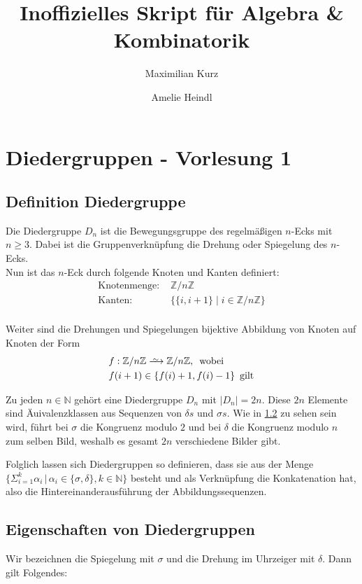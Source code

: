 \documentclass[12pt, german]{article}
\title{Inoffizielles Skript für Algebra \& Kombinatorik}
\author{Maximilian Kurz \and Amelie Heindl}
\newcommand\iso{\xrightarrow{
		\,\smash{\raisebox{-0.65ex}{\ensuremath{\scriptstyle\sim}}}\,}}
\newcommand{\N}{\mathbb{N}}
\begin{document}
	\maketitle
	\newpage
	\tableofcontents
	\newpage
	
	\section{Diedergruppen - Vorlesung 1}
	\subsection{Definition Diedergruppe}
	Die Diedergruppe $D_n$ ist die Bewegungsgruppe des regelmä\ss igen $n$-Ecks mit $n \geq 3$. Dabei ist die Gruppenverknüpfung die Drehung oder Spiegelung des $n$-Ecks. \\ 
	
	Nun ist das $n$-Eck durch folgende Knoten und Kanten definiert: 
	\begin{align*}
		\text{Knotenmenge: } &\mathbb{Z}/n\mathbb{Z} \\
		\text{Kanten: } &\{ \{i, i+1\} \mid i \in \mathbb{Z}/n\mathbb{Z} \}  \\
	\end{align*}
	
	Weiter sind die Drehungen und Spiegelungen bijektive Abbildung von Knoten auf Knoten der Form
	\begin{align*}
		&f: \mathbb{Z}/n\mathbb{Z} \iso \mathbb{Z}/n\mathbb{Z},\, \text{ wobei }\\
		&f(i+1) \in \{f(i)+1, f(i)-1\}\, \text{ gilt}
	\end{align*}
	
	Zu jeden $n \in \mathbb{N}$ gehört eine Diedergruppe $D_n$ mit $|D_n| = 2n$. 
	Diese $2n$ Elemente sind Äuivalenzklassen aus Sequenzen von $\delta s$ und $\sigma s$.
	Wie in \ref{sec:diederEigenschaften} zu sehen sein wird, führt bei $\sigma$ die Kongruenz modulo $2$ und bei $\delta$ die Kongruenz modulo $n$ zum selben Bild, weshalb es gesamt $2n$ verschiedene Bilder gibt.
	
	
	Folglich lassen sich Diedergruppen so definieren, dass sie aus der Menge $\{\Sigma_{i=1}^{k}\alpha_i \, | \, \alpha_i \in \{\sigma, \delta\}, k \in \N\}$ besteht und als Verknüpfung die Konkatenation hat, also die Hintereinanderausführung der Abbildungssequenzen.
	
	
	\subsection{Eigenschaften von Diedergruppen}
	\label{sec:diederEigenschaften}
	Wir bezeichnen die Spiegelung mit $\sigma$ und die Drehung im Uhrzeiger mit $\delta$. Dann gilt Folgendes:
	
\end{document}
